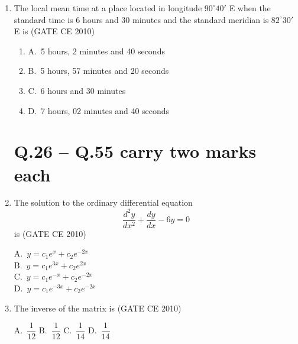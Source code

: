 \documentclass[journal,12pt,onecolumn]{exam}
\theoremstyle{remark}
\begin{document}
\begin{enumerate}
\noindent\item The local mean time at a place located in longitude $90^\circ40'$ E when the standard time is 6 hours and 30 minutes and the standard meridian is $82^\circ30'$ E is
\hfill{(GATE CE 2010)}
\begin{enumerate}[label=]
\item A.\ 5 hours, 2 minutes and 40 seconds \\
\item B.\ 5 hours, 57 minutes and 20 seconds \\
\item C.\ 6 hours and 30 minutes \\
\item D.\ 7 hours, 02 minutes and 40 seconds
\end{enumerate}

\raggedright
    
\section*{Q.26 -- Q.55 carry two marks each}

\noindent\item The solution to the ordinary differential equation
\[
\frac{d^2y}{dx^2} + \frac{dy}{dx} - 6y = 0
\]
is
\hfill{(GATE CE 2010)}
\begin{multicols}{4}
A.\ $y = c_1 e^x + c_2 e^{-2x}$ \\
B.\ $y = c_1 e^{3x} + c_2 e^{2x}$ \\
C.\ $y = c_1 e^{-x} + c_2 e^{-2x}$ \\
D.\ $y = c_1 e^{-3x} + c_2 e^{-2x}$
\end{multicols}

\item The inverse of the matrix  is
\hfill{(GATE CE 2010)}\newline

\begin{multicols}{2}
A.\ $\dfrac{1}{12}$
B.\ $\dfrac{1}{12}$
C.\ $\dfrac{1}{14}$
D.\ $\dfrac{1}{14}$
\end{multicols}


\end{enumerate}
\end{document}
